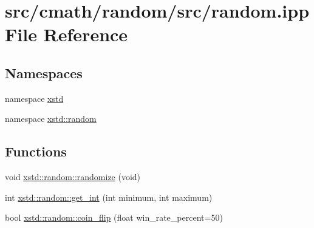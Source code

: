 \hypertarget{random_8ipp}{\section{src/cmath/random/src/random.ipp File Reference}
\label{random_8ipp}
}
\subsection*{Namespaces}
\begin{DoxyCompactItemize}
\item 
namespace \hyperlink{namespacexstd}{xstd}
\item 
namespace \hyperlink{namespacexstd_1_1random}{xstd\-::random}
\end{DoxyCompactItemize}
\subsection*{Functions}
\begin{DoxyCompactItemize}
\item 
void \hyperlink{namespacexstd_1_1random_aebd951891ee8cc82c7a61482ad3dabc6}{xstd\-::random\-::randomize} (void)
\item 
int \hyperlink{namespacexstd_1_1random_a1572ab839ec96ad9a8452c859199230a}{xstd\-::random\-::get\-\_\-int} (int minimum, int maximum)
\item 
bool \hyperlink{namespacexstd_1_1random_ae59f15bad38afbe5db860719a262cd8c}{xstd\-::random\-::coin\-\_\-flip} (float win\-\_\-rate\-\_\-percent=50)
\end{DoxyCompactItemize}
